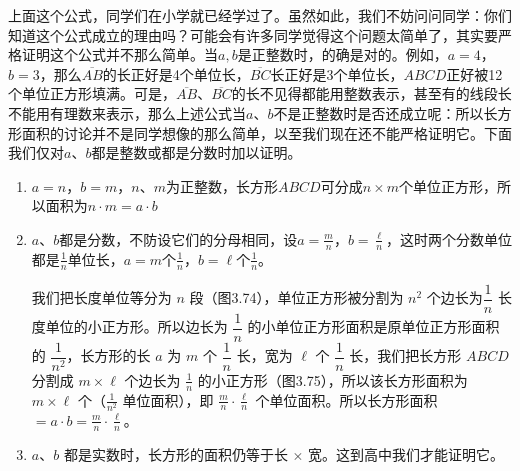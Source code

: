 上面这个公式，同学们在小学就已经学过了。虽然如此，我们不妨问问同学：你们知道这个公式成立的理由吗？可能会有许多同学觉得这个问题太简单了，其实要严格证明这个公式并不那么简单。当$a,b$是正整数时，的确是对的。例如，$a=4$，$b=3$，那么$\overline{AB}$的长正好是4个单位长，$\overline{BC}$长正好是3个单位长，$ABCD$正好被12个单位正方形填满。可是，$\overline{AB}$、$\overline{BC}$的长不见得都能用整数表示，甚至有的线段长不能用有理数来表示，那么上述公式当$a$、$b$不是正整数时是否还成立呢：所以长方形面积的讨论并不是同学想像的那么简单，以至我们现在还不能严格证明它。下面我们仅对$a$、$b$都是整数或都是分数时加以证明。

\begin{enumerate}
  \item  $a=n$，$b=m$，$n$、$m$为正整数，长方形$ABCD$可分成$n\times m$个单位正方形，所以面积为$n\cdot m=a\cdot b$
  \item  $a$、$b$都是分数，不防设它们的分母相同，设$a=\frac{m}{n}$，$b=\frac{\ell}{n}$，这时两个分数单位都是$\frac{1}{n}$单位长，$a=m$个$\frac{1}{n}$，$b=\ell$个$\frac{1}{n}$。

  我们把长度单位等分为 $n$ 段（图3.74），单位正方形被分割为 $n^2$ 个边长为$\dfrac{1}{n}$ 长度单位的小正方形。所以边长为 $\dfrac{1}{n}$ 的小单位正方形面积是原单位正方形面积的 $\dfrac{1}{n^2}$，长方形的长 $a$ 为 $m$ 个 $\dfrac{1}{n}$ 长，宽为 $\ell$ 个 $\dfrac{1}{n}$ 长，我们把长方形 $ABCD$ 分割成 $m\times \ell$ 个边长为 $\frac{1}{n}$ 的小正方形（图3.75），所以该长方形面积为 $m\times\ell$ 个（$\frac{1}{n^2}$ 单位面积），即 $\frac{m}{n}\cdot\frac{\ell}{n}$ 个单位面积。所以长方形面积 $=a\cdot b=\frac{m}{n}\cdot\frac{\ell}{n}$。
  \item $a$、$b$ 都是实数时，长方形的面积仍等于长 $\times$ 宽。这到高中我们才能证明它。
\end{enumerate}

\begin{figure}
\begin{minipage}[t]{0.4\linewidth}
\centering
{}
\caption{}
\end{minipage}
\begin{minipage}[t]{0.55\linewidth}
\centering
{}
\caption{}
\end{minipage}
\end{figure}


